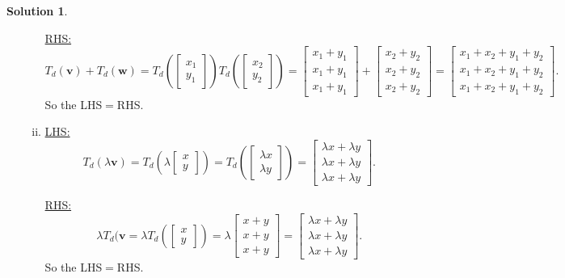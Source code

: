 \documentclass[12pt]{report} %
\theoremstyle{definition}
\newtheorem{solution}{Solution}
\begin{document}
\begin{solution}
\begin{enumerate}[(a)]
\begin{enumerate}[(i)]
        \noindent\underline{RHS:}
        \[
        T_d(\mathbf{v})+T_d(\mathbf{w})=T_d\left( \begin{bmatrix} x_1 \\ y_1 \end{bmatrix}\right) T_d \left( \begin{bmatrix} x_2 \\ y_2 \end{bmatrix}\right)=\begin{bmatrix} x_1+y_1\\x_1+y_1\\x_1+y_1\end{bmatrix} +\begin{bmatrix} x_2+y_2\\x_2+y_2\\x_2+y_2\end{bmatrix}=\begin{bmatrix} x_1+x_2+y_1+y_2\\x_1+x_2+y_1+y_2\\ x_1+x_2+y_1+y_2\end{bmatrix}.
        \]
        So the LHS$=$RHS.
        
        \item \noindent\underline{LHS:}
        \[
        T_d(\lambda \mathbf{v})=T_d\left( \lambda \begin{bmatrix} x\\ y\end{bmatrix} \right) =T_d\left( \begin{bmatrix}\lambda x\\ \lambda y\end{bmatrix} \right)= \begin{bmatrix} \lambda x + \lambda y\\ \lambda x + \lambda y \\ \lambda x + \lambda y\end{bmatrix}.
        \]
        
        \noindent\underline{RHS:}
        \[
        \lambda T_d(\mathbf{v}=\lambda T_d\left( \begin{bmatrix} x\\ y\end{bmatrix}\right) = \lambda \begin{bmatrix} x+y\\x+y\\x+y\end{bmatrix}=\begin{bmatrix} \lambda x + \lambda y\\ \lambda x + \lambda y \\ \lambda x + \lambda y\end{bmatrix}.
        \]
        So the LHS$=$RHS.
        

\end{enumerate}
\end{enumerate}
\end{solution}
\end{document}
